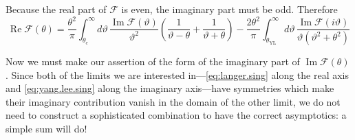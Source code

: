 \documentclass[
  aps,
  pre,
  preprint,
  longbibliography,
  floatfix
]{revtex4-2}
\begin{document}
Because the real part of $\mathcal F$ is even, the imaginary part must be odd. Therefore
\begin{equation} \label{eq:dispersion}
  \operatorname{Re}\mathcal F(\theta)
  =\frac{\theta^2}{\pi}
  \int_{\theta_c}^\infty d\vartheta\,\frac{\operatorname{Im}\mathcal F(\vartheta)}{\vartheta^2}\left(\frac1{\vartheta-\theta}+\frac1{\vartheta+\theta}\right)
  -\frac{2\theta^2}\pi\int_{\theta_{\mathrm{YL}}}^{\infty}d\vartheta\,\frac{\operatorname{Im}\mathcal F(i\vartheta)}{\vartheta(\vartheta^2+\theta^2)}
\end{equation}

Now we must make our assertion of the form of the imaginary part of
$\operatorname{Im}\mathcal F(\theta)$. Since both of the limits we are
interested in---\eqref{eq:langer.sing} along the real axis and
\eqref{eq:yang.lee.sing} along the imaginary axis---have symmetries which make
their imaginary contribution vanish in the domain of the other limit, we do not
need to construct a sophisticated combination to have the correct asymptotics:
a simple sum will do!
\end{document}
